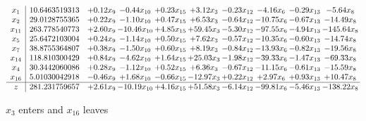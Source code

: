 \documentclass[9pt]{article}
\begin{document}
 \[\begin{array}{c| c c@{\hskip 2pt} c@{\hskip 2pt} c@{\hskip 2pt} c@{\hskip 2pt} c@{\hskip 2pt} c@{\hskip 2pt} c@{\hskip 2pt} c@{\hskip 2pt} }
 x_{1}   &  10.6463519313 & +  0.12 x_{9} & -0.44 x_{10} & +  0.23 x_{15} & +  3.12 x_{3} & -0.23 x_{12} & -4.16 x_{6} & -0.29 x_{13} & -5.64 x_{8}\\
 x_{2}   &  29.0128755365 & +  0.22 x_{9} & -1.10 x_{10} & +  0.47 x_{15} & +  6.53 x_{3} & -0.64 x_{12} & -10.75 x_{6} & -0.67 x_{13} & -14.49 x_{8}\\
 x_{11}   &  263.778540773 & +  2.60 x_{9} & -10.46 x_{10} & +  4.85 x_{15} & + 59.45 x_{3} & -5.30 x_{12} & -97.55 x_{6} & -4.94 x_{13} & -145.64 x_{8}\\
 x_{5}   &  25.6472103004 & +  0.24 x_{9} & -1.14 x_{10} & +  0.50 x_{15} & +  7.62 x_{3} & -0.57 x_{12} & -10.35 x_{6} & -0.60 x_{13} & -14.74 x_{8}\\
 x_{7}   &  38.8755364807 & +  0.38 x_{9} & -1.50 x_{10} & +  0.60 x_{15} & +  8.19 x_{3} & -0.84 x_{12} & -13.93 x_{6} & -0.82 x_{13} & -19.56 x_{8}\\
 x_{14}   &  118.810300429 & +  0.84 x_{9} & -4.62 x_{10} & +  1.64 x_{15} & + 25.03 x_{3} & -1.98 x_{12} & -39.33 x_{6} & -1.47 x_{13} & -69.33 x_{8}\\
 x_{4}   &  30.3442060086 & +  0.28 x_{9} & -1.12 x_{10} & +  0.52 x_{15} & +  6.36 x_{3} & -0.67 x_{12} & -11.15 x_{6} & -0.61 x_{13} & -15.59 x_{8}\\
 x_{16}   &  5.01030042918 & -0.46 x_{9} & +  1.68 x_{10} & -0.66 x_{15} & -12.97 x_{3} & +  0.22 x_{12} & +  2.97 x_{6} & +  0.93 x_{13} & + 10.47 x_{8}\\
\hline
z    &  281.231759657 & +  2.61 x_{9} & -10.19 x_{10} & +  4.16 x_{15} & + 51.58 x_{3} & -6.14 x_{12} & -99.81 x_{6} & -5.46 x_{13} & -138.22 x_{8}\\
\end{array}\]


 $ x_{3} $ enters and $ x_{16} $ leaves 
\end{document}
